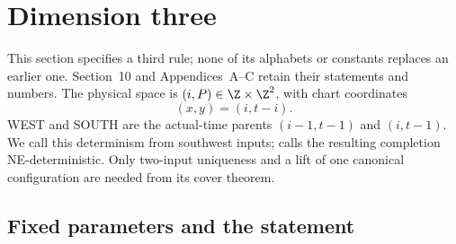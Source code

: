 \section{Dimension three}\label{sec:three}

This section specifies a third rule; none of its alphabets or constants replaces an earlier one. Section~10 and Appendices~A--C retain their statements and numbers. The physical space is $(i,P)\in\Z\times\Z^2$, with chart coordinates
\begin{equation}\label{eq:three-chart-time}
 (x,y)=(i,t-i).
\end{equation}
WEST and SOUTH are the actual-time parents $(i-1,t-1)$ and $(i,t-1)$. We call this determinism from southwest inputs; \cite{LGO12} calls the resulting completion NE-deterministic. Only two-input uniqueness and a lift of one canonical configuration are needed from its cover theorem.

\subsection{Fixed parameters and the statement}

